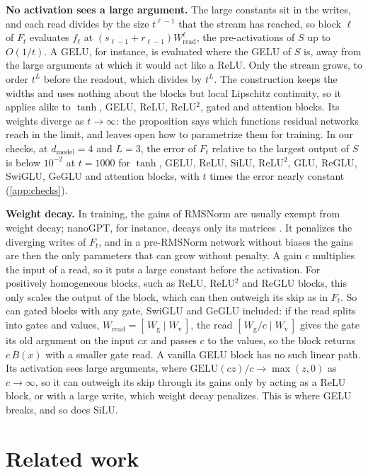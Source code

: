 \documentclass[10pt]{article}
\theoremstyle{definition}
\theoremstyle{remark}
\newcommand{\Wread}{W_{\mathrm{read}}}
\newcommand{\dm}{d_{\mathrm{model}}}
\newcommand{\para}[1]{\smallskip\noindent\textbf{#1}\hspace{0.5em}}
\begin{document}
\para{No activation sees a large argument.} The large constants sit in the writes, and each read divides by the size $t^{\ell-1}$ that the stream has reached, so block $\ell$ of $F_t$ evaluates $f_\ell$ at $(s_{\ell-1} + r_{\ell-1})\Wread^{\ell}$, the pre-activations of $S$ up to $O(1/t)$. A GELU, for instance, is evaluated where the GELU of $S$ is, away from the large arguments at which it would act like a ReLU. Only the stream grows, to order $t^L$ before the readout, which divides by $t^L$. The construction keeps the widths and uses nothing about the blocks but local Lipschitz continuity, so it applies alike to $\tanh$, GELU, ReLU, ReLU$^2$, gated and attention blocks. Its weights diverge as $t \to \infty$: the proposition says which functions residual networks reach in the limit, and leaves open how to parametrize them for training. In our checks, at $\dm = 4$ and $L = 3$, the error of $F_t$ relative to the largest output of $S$ is below $10^{-2}$ at $t = 1000$ for $\tanh$, GELU, ReLU, SiLU, ReLU$^2$, GLU, ReGLU, SwiGLU, GeGLU and attention blocks, with $t$ times the error nearly constant (\cref{app:checks}).

\para{Weight decay.} In training, the gains of RMSNorm are usually exempt from weight decay; nanoGPT, for instance, decays only its matrices \citep{karpathy2023nanogpt}. It penalizes the diverging writes of $F_t$, and in a pre-RMSNorm network without biases the gains are then the only parameters that can grow without penalty. A gain $c$ multiplies the input of a read, so it puts a large constant before the activation. For positively homogeneous blocks, such as ReLU, ReLU$^2$ and ReGLU blocks, this only scales the output of the block, which can then outweigh its skip as in $F_t$. So can gated blocks with any gate, SwiGLU and GeGLU included: if the read splits into gates and values, $\Wread = [\,W_{\mathrm g} \mid W_{\mathrm v}\,]$, the read $[\,W_{\mathrm g}/c \mid W_{\mathrm v}\,]$ gives the gate its old argument on the input $cx$ and passes $c$ to the values, so the block returns $c\,B(x)$ with a smaller gate read. A vanilla GELU block has no such linear path. Its activation sees large arguments, where $\mathrm{GELU}(cz)/c \to \max(z, 0)$ as $c \to \infty$, so it can outweigh its skip through its gains only by acting as a ReLU block, or with a large write, which weight decay penalizes. This is where GELU breaks, and so does SiLU.

\section{Related work}\label{sec:related}
\end{document}
